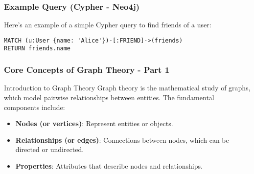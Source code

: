 \documentclass[aspectratio=169]{beamer}
\begin{document}
\begin{frame}[fragile]
    \frametitle{Example Query (Cypher - Neo4j)}
    Here's an example of a simple Cypher query to find friends of a user:
    \begin{lstlisting}
MATCH (u:User {name: 'Alice'})-[:FRIEND]->(friends)
RETURN friends.name
    \end{lstlisting}
\end{frame}

\begin{frame}[fragile]
    \frametitle{Core Concepts of Graph Theory - Part 1}
    \begin{block}{Introduction to Graph Theory}
        Graph theory is the mathematical study of graphs, which model pairwise relationships between entities.
        The fundamental components include:
        \begin{itemize}
            \item \textbf{Nodes (or vertices)}: Represent entities or objects.
            \item \textbf{Relationships (or edges)}: Connections between nodes, which can be directed or undirected.
            \item \textbf{Properties}: Attributes that describe nodes and relationships.
        \end{itemize}
    \end{block}
\end{frame}
\end{document}
